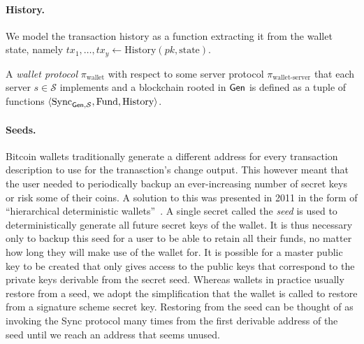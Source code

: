 \paragraph{History.}
We model the transaction history as a function extracting it from the wallet state, namely $tx_1, \dots, tx_y \gets \text{History}(pk, \text{state})$.

\begin{definition}
A \emph{wallet protocol} $\pi_\text{wallet}$ with respect to some server protocol $\pi_\text{wallet-server}$ that each server $s \in \mathcal{S}$ implements and a blockchain rooted in $\textsf{Gen}$ is defined as a tuple of functions $\langle\text{Sync}_{\textsf{Gen}, \mathcal{S}}, \text{Fund}, \text{History}\rangle$.
\end{definition}

\paragraph{Seeds.}
Bitcoin wallets traditionally generate a different address for every transaction description to use for the tranasction's change output. This however meant that the user needed to periodically backup an ever-increasing number of secret keys or risk some of their coins. A solution to this was presented in 2011 in the form of ``hierarchical deterministic wallets''~\cite{first-deterministic,bip32}. A single secret called the \emph{seed} is used to deterministically generate all future secret keys of the wallet. It is thus necessary only to backup this seed for a user to be able to retain all their funds, no matter how long they will make use of the wallet for. It is possible for a master public key to be created that only gives access to the public keys that correspond to the private keys derivable from the secret seed. Whereas wallets in practice usually restore from a seed, we adopt the simplification that the wallet is called to restore from a signature scheme secret key. Restoring from the seed can be thought of as invoking the Sync protocol many times from the first derivable address of the seed until we reach an address that seems unused.
